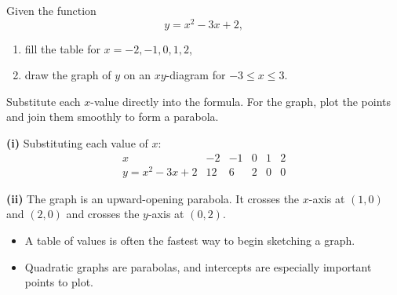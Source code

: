 \begin{problem}
Given the function
\[
y=x^2-3x+2,
\]
\begin{enumerate}[label=(\roman*)]
\item fill the table for $x=-2,-1,0,1,2$,
\item draw the graph of $y$ on an $xy$-diagram for $-3\le x\le 3$.
\end{enumerate}
\end{problem}

\begin{hint}
Substitute each $x$-value directly into the formula. For the graph, plot the points and join them smoothly to form a parabola.
\end{hint}

\begin{solution}
\textbf{(i)} Substituting each value of $x$:
\[
\begin{array}{c|ccccc}
x & -2 & -1 & 0 & 1 & 2\\ \hline
y=x^2-3x+2 & 12 & 6 & 2 & 0 & 0
\end{array}
\]

\textbf{(ii)} The graph is an upward-opening parabola. It crosses the $x$-axis at $(1,0)$ and $(2,0)$ and crosses the $y$-axis at $(0,2)$.

\begin{center}
\end{center}
\end{solution}

\begin{takeaways}
\begin{itemize}[leftmargin=*]
\item A table of values is often the fastest way to begin sketching a graph.
\item Quadratic graphs are parabolas, and intercepts are especially important points to plot.
\end{itemize}
\end{takeaways}

